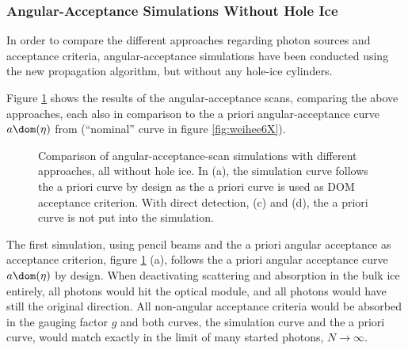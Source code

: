 

\subsubsection{Angular-Acceptance Simulations Without Hole Ice}
\label{sec:angular_acceptance_simulations_without_hole_ice}

In order to compare the different approaches regarding photon sources and acceptance criteria, angular-acceptance simulations have been conducted using the new propagation algorithm, but without any hole-ice cylinders.


Figure \ref{fig:Shai8yah} shows the results of the angular-acceptance scans, comparing the above approaches, each also in comparison to the a priori angular-acceptance curve $a\dom(\eta)$ from \cite{icepaper} (``nominal'' curve in figure \ref{fig:weihee6X}).

\begin{figure}[htbp]
  \hfill
  \hfill
  \hfill
  \caption{Comparison of angular-acceptance-scan simulations with different approaches, all without hole ice. In (a), the simulation curve follows the a priori curve by design as the a priori curve is used as DOM acceptance criterion. With direct detection, (c) and (d), the a priori curve is not put into the simulation.}
  \label{fig:Shai8yah}
\end{figure}

The first simulation, using pencil beams and the a priori angular acceptance as acceptance criterion, figure \ref{fig:Shai8yah} (a), follows the a priori angular acceptance curve $a\dom(\eta)$ by design. When deactivating scattering and absorption in the bulk ice entirely, all photons would hit the optical module, and all photons would have still the original direction. All non-angular acceptance criteria would be absorbed in the gauging factor $g$ and both curves, the simulation curve and the a priori curve, would match exactly in the limit of many started photons, $N\rightarrow\infty$.

